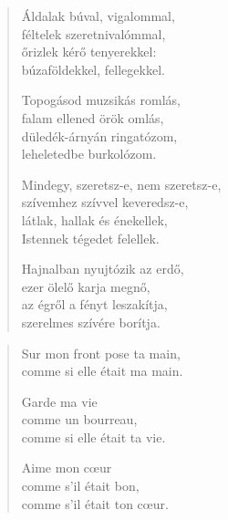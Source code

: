 \documentclass[11pt]{book}
\newcommand*{\centeredornament}{\centerline{\pgfornament[width=6cm]{88}}}
\begin{document}
\newpage

\vspace*{-15mm}
\centeredornament



\begin{verse}
  Áldalak búval, vigalommal, \\
  féltelek szeretnivalómmal, \\
  őrizlek kérő tenyerekkel: \\
  búzaföldekkel, fellegekkel.

  Topogásod muzsikás romlás, \\
  falam ellened örök omlás, \\
  düledék-árnyán ringatózom, \\
  leheletedbe burkolózom.

  Mindegy, szeretsz-e, nem szeretsz-e, \\
  szívemhez szívvel keveredsz-e, \\
  látlak, hallak és énekellek, \\
  Istennek tégedet felellek.

  Hajnalban nyujtózik az erdő, \\
  ezer ölelő karja megnő, \\
  az égről a fényt leszakítja, \\
  szerelmes szívére borítja.
\end{verse}

\newpage

\vspace*{-15mm}
\centeredornament



\begin{verse}
  Sur mon front pose ta main, \\
  comme si elle était ma main.

  Garde ma vie \\
  comme un bourreau, \\
  comme si elle était ta vie.

  Aime mon cœur \\
  comme s'il était bon, \\
  comme s'il était ton cœur.
\end{verse}

\newpage

\vspace*{-15mm}
\centeredornament
\end{document}
